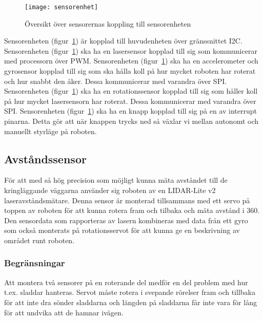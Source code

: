 \documentclass{article}
\begin{document}
\begin{figure}[H]
\centering
\texttt{[image: sensorenhet]}
\caption{Översikt över sensorernas koppling till sensorenheten}
\label{fig:sensorenhet}
\end{figure}
Sensorenheten (figur~\ref{fig:sensorenhet}) är kopplad till huvudenheten över gränssnittet I2C.\newline\newline
Sensorenheten (figur~\ref{fig:sensorenhet}) ska ha en lasersensor kopplad till sig som kommunicerar med processorn över PWM.\newline\newline
Sensorenheten (figur~\ref{fig:sensorenhet}) ska ha en accelerometer och gyrosensor kopplad till sig som ska hålla koll på hur mycket roboten har roterat och hur snabbt den åker. Dessa kommunicerar med varandra över SPI. \newline\newline
Sensorenheten (figur~\ref{fig:sensorenhet}) ska ha en rotationssensor kopplad till sig som håller koll på hur mycket lasersensorn har roterat. Dessa kommunicerar med varandra över SPI. \newline\newline
Sensorenheten (figur~\ref{fig:sensorenhet}) ska ha en knapp kopplad till sig på en av interrupt pinarna. Detta gör att när knappen trycks ned så växlar vi mellan autonomt och manuellt styrläge på roboten. \newline\newline

\subsection{Avståndssensor}
För att med så hög precision som möjligt kunna mäta avståndet till de kringläggande väggarna använder sig roboten av en LIDAR-Lite v2 laseravståndsmätare. Denna sensor är monterad tillsammans med ett servo på toppen av roboten för att kunna rotera fram och tilbaka och mäta avstånd i 360\textdegree. Den sensordata som rapporteras av lasern kombineras med data från ett gyro som också monterats på rotationsservot för att kunna ge en beskrivning av området runt roboten.

\subsubsection{Begränsningar}
Att montera två sensorer på en roterande del medför en del problem med hur t.ex. sladdar hanteras. Servot måste rotera i svepande rörelser fram och tillbaka för att inte dra sönder sladdarna och längden på sladdarna får inte vara för lång för att undvika att de hamnar ivägen.
\end{document}
